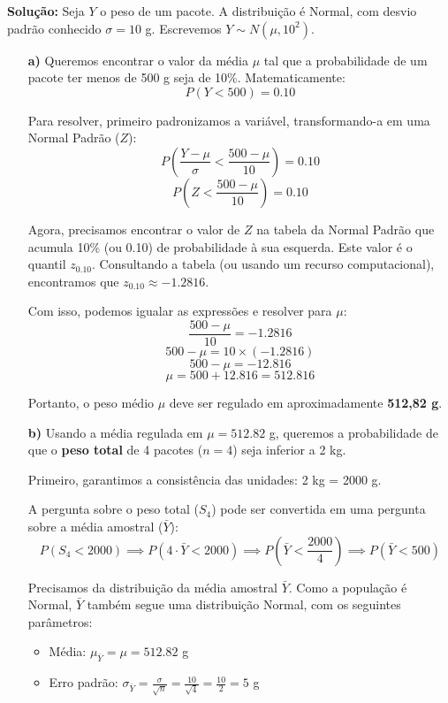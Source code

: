 \documentclass[12pt, a4paper]{article}
\begin{document}
\textbf{Solução:}
Seja $Y$ o peso de um pacote. A distribuição é Normal, com desvio padrão conhecido $\sigma = 10$ g. Escrevemos $Y \sim N(\mu, 10^2)$.

\begin{itemize}
    \item[\textbf{a)}] Queremos encontrar o valor da média $\mu$ tal que a probabilidade de um pacote ter menos de 500 g seja de 10\%. Matematicamente:
    $$ P(Y < 500) = 0.10 $$
    
    Para resolver, primeiro padronizamos a variável, transformando-a em uma Normal Padrão ($Z$):
    $$ P\left( \frac{Y - \mu}{\sigma} < \frac{500 - \mu}{10} \right) = 0.10 $$
    $$ P\left( Z < \frac{500 - \mu}{10} \right) = 0.10 $$
    
    Agora, precisamos encontrar o valor de $Z$ na tabela da Normal Padrão que acumula 10\% (ou 0.10) de probabilidade à sua esquerda. Este valor é o quantil $z_{0.10}$.
    Consultando a tabela (ou usando um recurso computacional), encontramos que $z_{0.10} \approx -1.2816$.
    
    Com isso, podemos igualar as expressões e resolver para $\mu$:
    $$ \frac{500 - \mu}{10} = -1.2816 $$
    $$ 500 - \mu = 10 \times (-1.2816) $$
    $$ 500 - \mu = -12.816 $$
    $$ \mu = 500 + 12.816 = 512.816 $$
    
    Portanto, o peso médio $\mu$ deve ser regulado em aproximadamente \textbf{512,82 g}.
    
    \item[\textbf{b)}] Usando a média regulada em $\mu = 512.82$ g, queremos a probabilidade de que o \textbf{peso total} de 4 pacotes ($n=4$) seja inferior a 2 kg.
    
    Primeiro, garantimos a consistência das unidades: 2 kg = 2000 g.
    
    A pergunta sobre o peso total ($S_4$) pode ser convertida em uma pergunta sobre a média amostral ($\bar{Y}$):
    $$ P(S_4 < 2000) \implies P(4 \cdot \bar{Y} < 2000) \implies P(\bar{Y} < \frac{2000}{4}) \implies P(\bar{Y} < 500) $$
    
    Precisamos da distribuição da média amostral $\bar{Y}$. Como a população é Normal, $\bar{Y}$ também segue uma distribuição Normal, com os seguintes parâmetros:
    \begin{itemize}
        \item Média: $\mu_{\bar{Y}} = \mu = 512.82$ g
        \item Erro padrão: $\sigma_{\bar{Y}} = \frac{\sigma}{\sqrt{n}} = \frac{10}{\sqrt{4}} = \frac{10}{2} = 5$ g
    \end{itemize}
    

\end{itemize}
\end{document}
